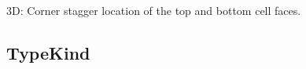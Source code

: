 \documentclass[letterpaper,10pt,english]{sphinxmanual}
\begin{document}
\begin{fulllineitems}
\begin{fulllineitems}
\end{fulllineitems}


\begin{fulllineitems}
\label{\detokenize{StaggerLoc:ESMF.api.constants.StaggerLoc.CORNER_VFACE}}
3D: Corner stagger location of the top and bottom cell faces.

\end{fulllineitems}


\end{fulllineitems}



\subsection{TypeKind}
\label{\detokenize{TypeKind:typekind}}\label{\detokenize{TypeKind::doc}}
\end{document}
